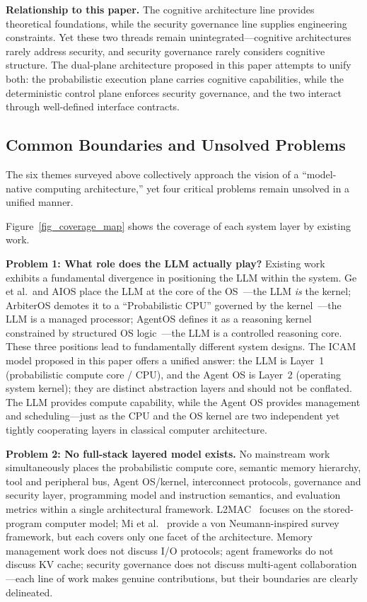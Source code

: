 \documentclass[11pt,a4paper]{article}
\begin{document}
\textbf{Relationship to this paper.}
The cognitive architecture line provides theoretical foundations, while the security governance line supplies engineering constraints.
Yet these two threads remain unintegrated---cognitive architectures rarely address security, and security governance rarely considers cognitive structure.
The dual-plane architecture proposed in this paper attempts to unify both: the probabilistic execution plane carries cognitive capabilities, while the deterministic control plane enforces security governance, and the two interact through well-defined interface contracts.

\subsection{Common Boundaries and Unsolved Problems}
\label{sec:related-gap}

The six themes surveyed above collectively approach the vision of a ``model-native computing architecture,'' yet four critical problems remain unsolved in a unified manner.

Figure~\ref{fig_coverage_map} shows the coverage of each system layer by existing work.


\textbf{Problem 1: What role does the LLM actually play?}
Existing work exhibits a fundamental divergence in positioning the LLM within the system.
Ge et al.\ and AIOS place the LLM at the core of the OS~\cite{ge2023llmos,mei2024aios}---the LLM \textit{is} the kernel;
ArbiterOS demotes it to a ``Probabilistic CPU'' governed by the kernel~\cite{arbiteros2025}---the LLM is a managed processor;
AgentOS defines it as a reasoning kernel constrained by structured OS logic~\cite{agentos2025}---the LLM is a controlled reasoning core.
These three positions lead to fundamentally different system designs.
The ICAM model proposed in this paper offers a unified answer: the LLM is Layer~1 (probabilistic compute core / CPU), and the Agent OS is Layer~2 (operating system kernel); they are distinct abstraction layers and should not be conflated.
The LLM provides compute capability, while the Agent OS provides management and scheduling---just as the CPU and the OS kernel are two independent yet tightly cooperating layers in classical computer architecture.

\textbf{Problem 2: No full-stack layered model exists.}
No mainstream work simultaneously places the probabilistic compute core, semantic memory hierarchy, tool and peripheral bus, Agent OS/kernel, interconnect protocols, governance and security layer, programming model and instruction semantics, and evaluation metrics within a single architectural framework.
L2MAC~\cite{holt2024l2mac} focuses on the stored-program computer model; Mi et al.~\cite{mi2025llmagentscomputersystems} provide a von Neumann-inspired survey framework, but each covers only one facet of the architecture.
Memory management work does not discuss I/O protocols; agent frameworks do not discuss KV cache; security governance does not discuss multi-agent collaboration---each line of work makes genuine contributions, but their boundaries are clearly delineated.
\end{document}
